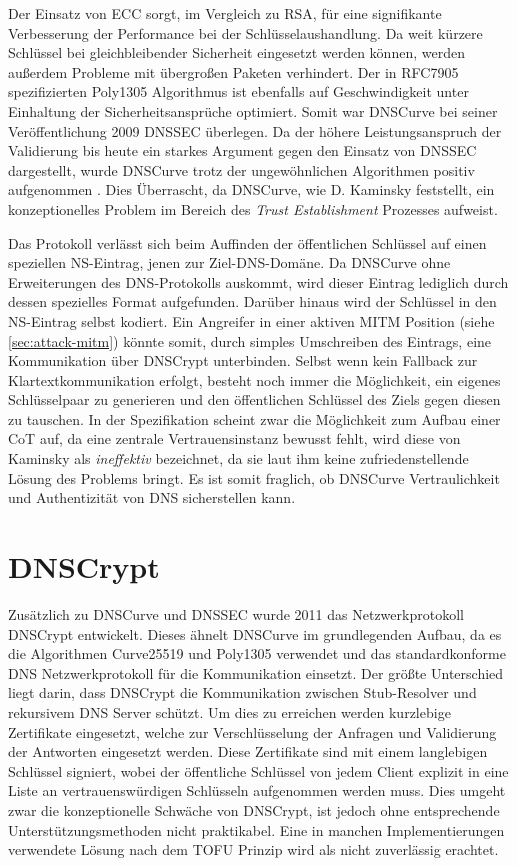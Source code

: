 Der Einsatz von \ac{ECC} sorgt, im Vergleich zu RSA, für eine signifikante Verbesserung der Performance bei der Schlüsselaushandlung. Da weit kürzere Schlüssel bei gleichbleibender Sicherheit eingesetzt werden können, werden außerdem Probleme mit übergroßen Paketen verhindert\cite{Gupta2002}. Der in RFC7905\cite{rfc7905} spezifizierten Poly1305 Algorithmus ist ebenfalls auf Geschwindigkeit unter Einhaltung der Sicherheitsansprüche optimiert\cite{Bernstein2005}. Somit war DNSCurve bei seiner Veröffentlichung 2009 \ac{DNSSEC} überlegen. Da der höhere Leistungsanspruch der Validierung bis heute ein starkes Argument gegen den Einsatz von \ac{DNSSEC} dargestellt, wurde DNSCurve trotz der ungewöhnlichen Algorithmen positiv aufgenommen \cite{Henry2013}. Dies Überrascht, da DNSCurve, wie D. Kaminsky feststellt, ein konzeptionelles Problem im Bereich des \textit{Trust Establishment} Prozesses aufweist\cite{Kaminsky2011}. 

Das Protokoll verlässt sich beim Auffinden der öffentlichen Schlüssel auf einen speziellen NS-Eintrag, jenen zur Ziel-DNS-Domäne. Da DNSCurve ohne Erweiterungen des DNS-Protokolls auskommt, wird dieser Eintrag lediglich durch dessen spezielles Format aufgefunden. Darüber hinaus wird der Schlüssel in den NS-Eintrag selbst kodiert. Ein Angreifer in einer aktiven MITM Position (siehe \ref{sec:attack-mitm}) könnte somit, durch simples Umschreiben des Eintrags, eine Kommunikation über DNSCrypt unterbinden. Selbst wenn kein Fallback zur Klartextkommunikation erfolgt, besteht noch immer die Möglichkeit, ein eigenes Schlüsselpaar zu generieren und den öffentlichen Schlüssel des Ziels gegen diesen zu tauschen. In der Spezifikation scheint zwar die Möglichkeit zum Aufbau einer CoT auf, da eine zentrale Vertrauensinstanz bewusst fehlt, wird diese von Kaminsky als \textit{ineffektiv} bezeichnet, da sie laut ihm keine zufriedenstellende Lösung des Problems bringt. Es ist somit fraglich, ob DNSCurve  Vertraulichkeit und Authentizität von DNS sicherstellen kann.  

\section{DNSCrypt}
Zusätzlich zu DNSCurve und \ac{DNSSEC} wurde 2011 das Netzwerkprotokoll DNSCrypt entwickelt. Dieses ähnelt DNSCurve im grundlegenden Aufbau, da es die Algorithmen Curve25519 und Poly1305 verwendet und das standardkonforme DNS Netzwerkprotokoll für die Kommunikation einsetzt. Der größte Unterschied liegt darin, dass DNSCrypt die Kommunikation zwischen Stub-Resolver und rekursivem DNS Server schützt. Um dies zu erreichen werden kurzlebige Zertifikate eingesetzt, welche zur Verschlüsselung der Anfragen und Validierung der Antworten eingesetzt werden. Diese Zertifikate sind mit einem langlebigen Schlüssel signiert, wobei der öffentliche Schlüssel von jedem Client explizit in eine Liste an vertrauenswürdigen Schlüsseln aufgenommen werden muss\cite{Denis2016}. Dies umgeht zwar die konzeptionelle Schwäche von DNSCrypt, ist jedoch ohne entsprechende Unterstützungsmethoden nicht praktikabel. Eine in manchen Implementierungen verwendete Lösung nach dem \ac{TOFU} Prinzip wird als nicht zuverlässig erachtet\cite{Wendlandt2008}. 

